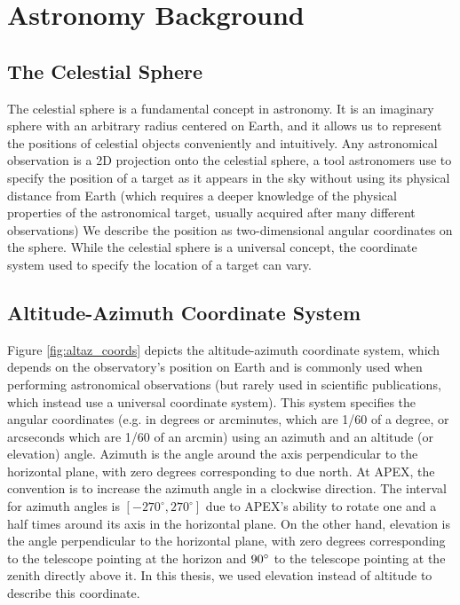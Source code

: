 \section{Astronomy Background}\label{sec:ast_terms}
\subsection{The Celestial Sphere}
The celestial sphere is a fundamental concept in astronomy.
It is an imaginary sphere with an arbitrary radius centered on Earth, and it allows us to represent the positions of celestial objects conveniently and intuitively.
Any astronomical observation is a 2D projection onto the celestial sphere,
a tool astronomers use to specify the position of a target as it appears in the sky without using its physical distance from Earth
(which requires a deeper knowledge of the physical properties of the astronomical target, usually acquired after many different observations)
We describe the position as two-dimensional angular coordinates on the sphere.
While the celestial sphere is a universal concept, the coordinate system used to specify the location of a target can vary.




\subsection{Altitude-Azimuth Coordinate System}\label{sec:altaz_coords}
Figure \ref{fig:altaz_coords} depicts the altitude-azimuth coordinate system,
which depends on the observatory's position on Earth and is commonly used when performing astronomical observations
(but rarely used in scientific publications, which instead use a universal coordinate system).
This system specifies the angular coordinates (e.g. in degrees or arcminutes, which are 1/60 of a degree, or arcseconds which are 1/60 of an arcmin)
using an azimuth and an altitude (or elevation) angle.
Azimuth is the angle around the axis perpendicular to the horizontal plane, with zero degrees corresponding to due north.
At APEX, the convention is to increase the azimuth angle in a clockwise direction.
The interval for azimuth angles is $[-270^\circ,270^\circ]$ due to APEX's ability to rotate one and a half times around its axis in the horizontal plane.
On the other hand, elevation is the angle perpendicular to the horizontal plane, with zero degrees corresponding to the telescope pointing at the horizon and $90^\circ$ to the telescope pointing at the zenith directly above it.
In this thesis, we used elevation instead of altitude to describe this coordinate.\\


